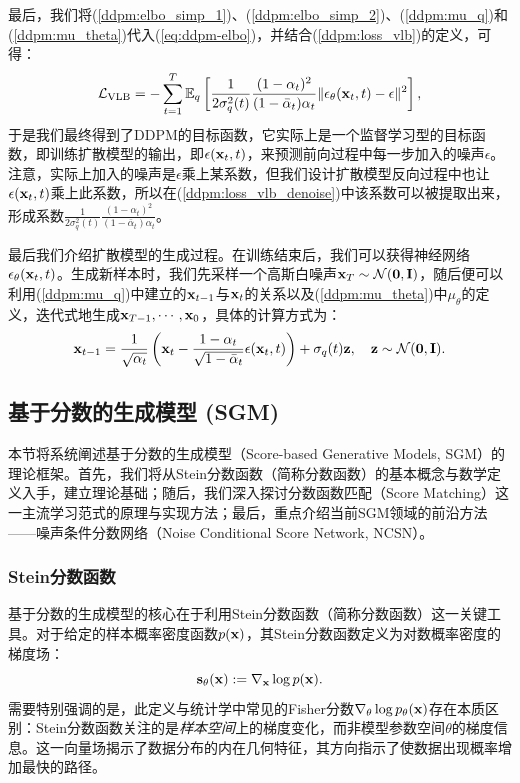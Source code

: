\documentclass[11pt,a4paper,UTF8]{ctexart}
\begin{document}
最后，我们将(\ref{ddpm:elbo_simp_1})、(\ref{ddpm:elbo_simp_2})、(\ref{ddpm:mu_q})和(\ref{ddpm:mu_theta})代入(\ref{eq:ddpm-elbo})，并结合(\ref{ddpm:loss_vlb})的定义，可得：
\begin{equation}
\mathcal{L}_{\text{VLB}} = -\sum_{t=1}^T \mathbb{E}_q \left[\frac{1}{2\sigma_q^2(t)}\frac{(1-\alpha_t)^2}{(1-\bar{\alpha}_t)\alpha_t}\|\epsilon_{\theta}(\mathbf{x}_t,t)-\epsilon \|^2 \right],
\label{ddpm:loss_vlb_denoise}
\end{equation}
于是我们最终得到了DDPM的目标函数，它实际上是一个监督学习型的目标函数，即训练扩散模型的输出，即$\epsilon(\mathbf{x}_t,t)$，来预测前向过程中每一步加入的噪声$\epsilon$。注意，实际上加入的噪声是$\epsilon$乘上某系数，但我们设计扩散模型反向过程中也让$\epsilon(\mathbf{x}_t,t)$乘上此系数，所以在(\ref{ddpm:loss_vlb_denoise})中该系数可以被提取出来，形成系数$\frac{1}{2\sigma_q^2(t)}\frac{(1-\alpha_t)^2}{(1-\bar{\alpha}_t)\alpha_t}$。

最后我们介绍扩散模型的生成过程。在训练结束后，我们可以获得神经网络$\epsilon_{\theta}(\mathbf{x}_t,t)$。生成新样本时，我们先采样一个高斯白噪声$\mathbf{x}_T\sim\mathcal{N}(\mathbf{0},\mathbf{I})$，随后便可以利用(\ref{ddpm:mu_q})中建立的$\mathbf{x}_{t-1}$与$\mathbf{x}_t$的关系以及(\ref{ddpm:mu_theta})中$\mu_\theta$的定义，迭代式地生成$\mathbf{x}_{T-1},\cdots,\mathbf{x}_0$，具体的计算方式为：
\begin{equation*}
    \mathbf{x}_{t-1} = \frac{1}{\sqrt{\alpha_t}}\left(\mathbf{x}_t -\frac{1-\alpha_t}{\sqrt{1-\bar{\alpha}_t}} \epsilon(\mathbf{x}_t,t) \right) + \sigma_q(t)\mathbf{z},\quad \mathbf{z}\sim\mathcal{N}(\mathbf{0},\mathbf{I}).
\end{equation*}

\subsection{基于分数的生成模型 (SGM)}

本节将系统阐述基于分数的生成模型（Score-based Generative Models, SGM）的理论框架。首先，我们将从Stein分数函数（简称分数函数）的基本概念与数学定义入手，建立理论基础；随后，我们深入探讨分数函数匹配（Score Matching）这一主流学习范式的原理与实现方法；最后，重点介绍当前SGM领域的前沿方法——噪声条件分数网络（Noise Conditional Score Network, NCSN）\cite{song2020score}。

\subsubsection{Stein分数函数}

基于分数的生成模型的核心在于利用Stein分数函数（简称分数函数）\cite{Hyvrinen2005EstimationON}这一关键工具。对于给定的样本概率密度函数$p(\mathbf{x})$，其Stein分数函数定义为对数概率密度的梯度场：
\begin{equation*}
    \mathbf{s}_\theta(\mathbf{x}) := \nabla_{\mathbf{x}}\log p(\mathbf{x}).
\end{equation*}
需要特别强调的是，此定义与统计学中常见的Fisher分数$\nabla_\theta \log p_{\theta}(\mathbf{x})$存在本质区别：Stein分数函数关注的是\emph{样本空间}上的梯度变化，而非模型参数空间$\theta$的梯度信息。这一向量场揭示了数据分布的内在几何特征，其方向指示了使数据出现概率增加最快的路径。
\end{document}

